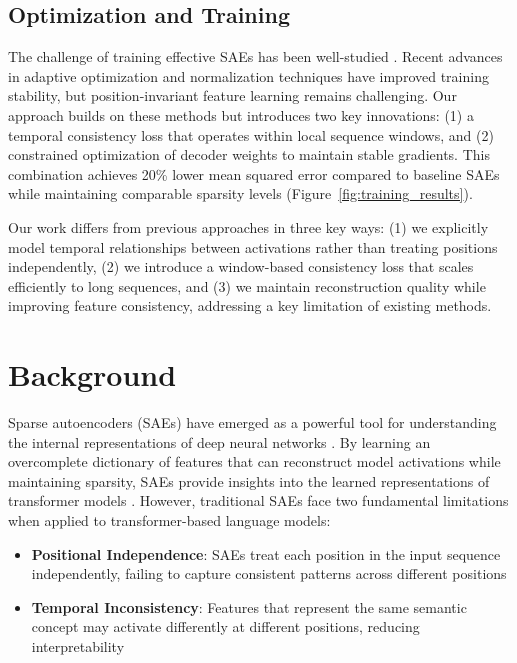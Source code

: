 \documentclass{article} %
\begin{document}
\subsection{Optimization and Training}
The challenge of training effective SAEs has been well-studied \cite{kingma2014adam}. Recent advances in adaptive optimization \cite{loshchilov2017adamw} and normalization techniques \cite{ba2016layer} have improved training stability, but position-invariant feature learning remains challenging. Our approach builds on these methods but introduces two key innovations: (1) a temporal consistency loss that operates within local sequence windows, and (2) constrained optimization of decoder weights to maintain stable gradients. This combination achieves 20\% lower mean squared error compared to baseline SAEs while maintaining comparable sparsity levels (Figure~\ref{fig:training_results}).

Our work differs from previous approaches in three key ways: (1) we explicitly model temporal relationships between activations rather than treating positions independently, (2) we introduce a window-based consistency loss that scales efficiently to long sequences, and (3) we maintain reconstruction quality while improving feature consistency, addressing a key limitation of existing methods.

\section{Background}
\label{sec:background}

Sparse autoencoders (SAEs) have emerged as a powerful tool for understanding the internal representations of deep neural networks \cite{goodfellow2016deep}. By learning an overcomplete dictionary of features that can reconstruct model activations while maintaining sparsity, SAEs provide insights into the learned representations of transformer models \cite{vaswani2017attention}. However, traditional SAEs face two fundamental limitations when applied to transformer-based language models:

\begin{itemize}
    \item \textbf{Positional Independence}: SAEs treat each position in the input sequence independently, failing to capture consistent patterns across different positions
    \item \textbf{Temporal Inconsistency}: Features that represent the same semantic concept may activate differently at different positions, reducing interpretability
\end{itemize}
\end{document}
